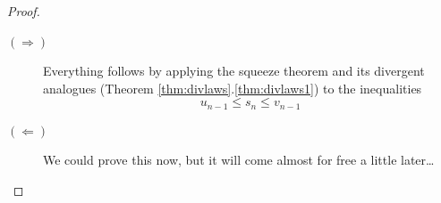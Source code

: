 \begin{proof}
	\begin{description}
		\item[$(\Rightarrow)$] Everything follows by applying the squeeze theorem and its divergent analogues (Theorem \ref*{thm:divlaws}.\ref{thm:divlaws1}) to the inequalities
		\[
			u_{n-1}\le s_n\le v_{n-1}
		\]
		\item[$(\Leftarrow)$] We could prove this now, but it will come almost for free a little later\ldots\qedhere
	\end{description}

		

% 	

\end{proof}
